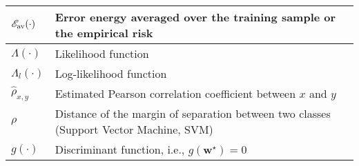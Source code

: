 \begin{xltabular}{\textwidth}{XX}
	\(\mathscr{E}_{\textnormal{av}}(\cdot)\)                                                                                                                                       & Error energy averaged over the training sample or the empirical risk  \cite{bishopPatternRecognitionMachine2006}                                                                                                                                                                                                                       \\ \hline
	\(\Lambda(\cdot)\)                                                                                                                                                             & Likelihood function                                                                                                                                                                                                                                                                                                                    \\ \hline
	\(\Lambda_l(\cdot)\)                                                                                                                                                           & Log-likelihood function                                                                                                                                                                                                                                                                                                                \\ \hline
	\(\hat{\rho}_{x,y}\)                                                                                                                                                           & Estimated Pearson correlation coefficient between \(x\) and \(y\)                                                                                                                                                                                                                                                                      \\ \hline
	\(\rho\)                                                                                                                                                                       & Distance of the margin of separation between two classes (Support Vector Machine, SVM)                                                                                                                                                                                                                                                 \\ \hline
	\(g(\cdot)\)                                                                                                                                                                   & Discriminant function, i.e., \(g(\mathbf{w}^{\star}) = 0\)
\end{xltabular}
